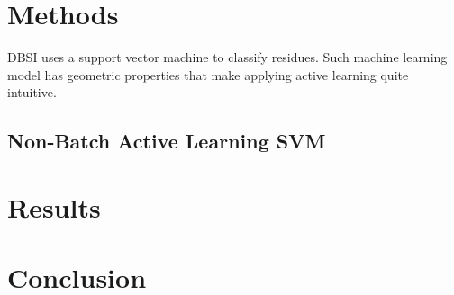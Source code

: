\documentclass{article}
\begin{document}
     
\section*{Methods}
DBSI uses a support vector machine to classify residues. Such machine learning model has geometric properties that make applying active learning quite intuitive. 

\subsection*{Non-Batch Active Learning SVM}


\cite{active_learning}
\section*{Results}
\section*{Conclusion}

{}

\end{document}
